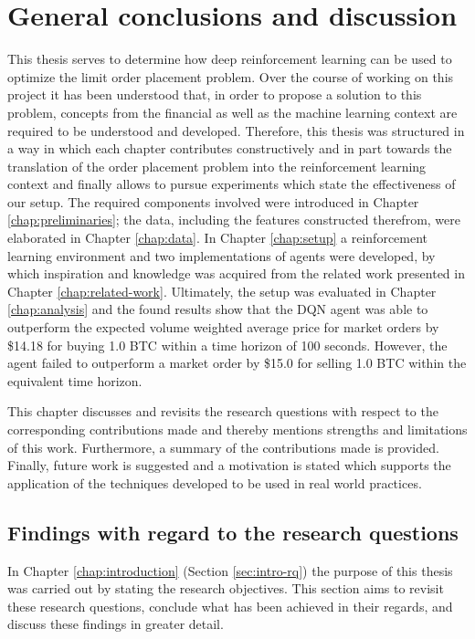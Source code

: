 \chapter{General conclusions and discussion}
\label{chap:discussion}

This thesis serves to determine how deep reinforcement learning can be used to optimize the limit order placement problem.
Over the course of working on this project it has been understood that, in order to propose a solution to this problem, concepts from the financial as well as the machine learning context are required to be understood and developed.
Therefore, this thesis was structured in a way in which each chapter contributes constructively and in part towards the translation of the order placement problem into the reinforcement learning context and finally allows to pursue experiments which state the effectiveness of our setup.
The required components involved were introduced in Chapter \ref{chap:preliminaries}; the data, including the features constructed therefrom, were elaborated in Chapter \ref{chap:data}.
In Chapter \ref{chap:setup} a reinforcement learning environment and two implementations of agents were developed, by which inspiration and knowledge was acquired from the related work presented in Chapter \ref{chap:related-work}.
Ultimately, the setup was evaluated in Chapter \ref{chap:analysis} and the found results show that the DQN agent was able to outperform the expected volume weighted average price for market orders by \$14.18 for buying 1.0 BTC within a time horizon of 100 seconds.
However, the agent failed to outperform a market order by \$15.0 for selling 1.0 BTC within the equivalent time horizon.

This chapter discusses and revisits the research questions with respect to the corresponding contributions made and thereby mentions strengths and limitations of this work.
Furthermore, a summary of the contributions made is provided.
Finally, future work is suggested and a motivation is stated which supports the application of the techniques developed to be used in real world practices.

\section{Findings with regard to the research questions}

In Chapter \ref{chap:introduction} (Section \ref{sec:intro-rq}) the purpose of this thesis was carried out by stating the research objectives.
This section aims to revisit these research questions, conclude what has been achieved in their regards, and discuss these findings in greater detail.

